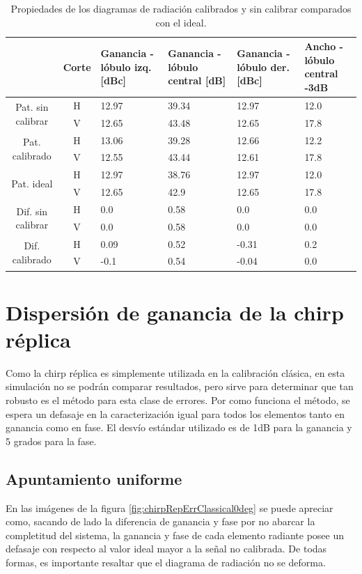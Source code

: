 \begin{table}[H]
  \footnotesize
  \centering
  \begin{tabular}{|c|c|p{2cm}|p{2.5cm}|p{2.5cm}|p{2.5cm}|}
    \cline{2-6}
    \multicolumn{1}{c|}{} & Corte & Ganancia - lóbulo izq. [dBc] & Ganancia - lóbulo central [dB] &
    Ganancia - lóbulo der. [dBc] & Ancho - lóbulo central -3dB \tabularnewline\hline
    \multirow{2}{2cm}{Pat. sin calibrar} & H & 12.97 & 39.34 & 12.97 & 12.0 \tabularnewline\cline{2-6}
     & V & 12.65 & 43.48 & 12.65 & 17.8 \tabularnewline\hline
    \multirow{2}{2cm}{Pat. calibrado} & H & 13.06 & 39.28 & 12.66 & 12.2 \tabularnewline\cline{2-6}
     & V & 12.55 & 43.44 & 12.61 & 17.8 \tabularnewline\hline
    \multirow{2}{2cm}{Pat. ideal} & H & 12.97 & 38.76 & 12.97 & 12.0 \tabularnewline\cline{2-6}
     & V & 12.65 & 42.9 & 12.65 & 17.8 \tabularnewline\hline
    \multirow{2}{2cm}{Dif. sin calibrar} & H & 0.0 & 0.58 & 0.0 & 0.0\tabularnewline\cline{2-6}
     & V & 0.0 & 0.58 & 0.0 & 0.0 \tabularnewline\hline
    \multirow{2}{2cm}{Dif. calibrado} & H & 0.09 & 0.52 & -0.31 & 0.2 \tabularnewline\cline{2-6}
     & V & -0.1 & 0.54 & -0.04 & 0.0 \tabularnewline\hline
  \end{tabular}
  \caption{Propiedades de los diagramas de radiación calibrados y sin calibrar comparados con el ideal.}
  \label{tab:chirpErrMutual10degRow}
\end{table}


\section{Dispersión de ganancia de la chirp réplica}

Como la chirp réplica es simplemente utilizada en la calibración clásica, en esta simulación no se podrán comparar 
resultados, pero sirve para determinar que tan robusto es el método para esta clase de errores. Por como funciona el método, 
se espera un defasaje en la caracterización igual para todos los elementos tanto en ganancia como en fase. El desvío estándar
utilizado es de 1dB para la ganancia y 5 grados para la fase.

\subsection{Apuntamiento uniforme}

En las imágenes de la figura \ref{fig:chirpRepErrClassical0deg} se puede apreciar como, sacando de lado la diferencia de 
ganancia y fase por no abarcar la completitud del sistema, la ganancia y fase de cada elemento radiante posee un defasaje con 
respecto al valor ideal mayor a la señal no calibrada. De todas formas, es importante resaltar que el diagrama de radiación no 
se deforma. 

